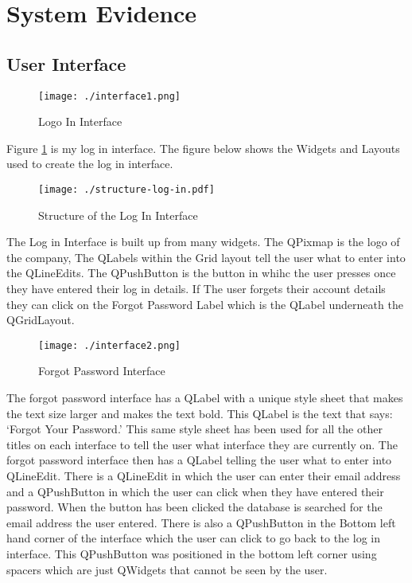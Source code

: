 	
	


\section{System Evidence}

\subsection{User Interface}

\begin{figure}[H]
    \texttt{[image: ./interface1.png]}
    \caption{Logo In Interface} \label{fig:log-in-interface}
\end{figure}

Figure \ref{fig:log-in-interface} is my log in interface. The figure below shows the Widgets and Layouts used to create the log in interface. 

\begin{figure}[H]
    \texttt{[image: ./structure-log-in.pdf]}
    \caption{Structure of the Log In Interface} \label{fig:log-in-structure}
\end{figure}

The Log in Interface is built up from many widgets. The QPixmap is the logo of the company, The QLabels within the Grid layout tell the user what to enter into the QLineEdits. The QPushButton is the button in whihc the user presses once they have entered their log in details. If The user forgets their account details they can click on the Forgot Password Label which is the QLabel underneath the QGridLayout.

\begin{figure}[H]
    \texttt{[image: ./interface2.png]}
    \caption{Forgot Password Interface} \label{fig:forgot-password-interface}
\end{figure}

The forgot password interface has a QLabel with a unique style sheet that makes the text size larger and makes the text bold. This QLabel is the text that says: `Forgot Your Password.' This same style sheet has been used for all the other titles on each interface to tell the user what interface they are currently on. The forgot password interface then has a QLabel telling the user what to enter into QLineEdit. There is a QLineEdit in which the user can enter their email address and a QPushButton in which the user can click when they have entered their password. When the button has been clicked the database is searched for the email address the user entered. There is also a QPushButton in the Bottom left hand corner of the interface which the user can click to go back to the log in interface. This QPushButton was positioned in the bottom left corner using spacers which are just QWidgets that cannot be seen by the user.


